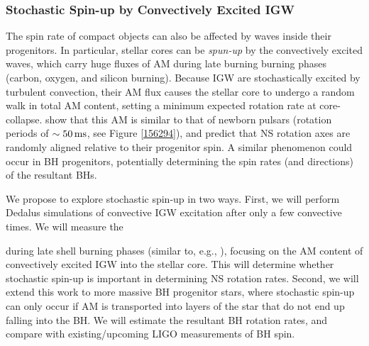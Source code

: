 \subsubsection{Stochastic Spin-up by Convectively Excited IGW}

The spin rate of compact objects can also be affected by waves inside their progenitors. In particular, stellar cores can be {\it spun-up} by the convectively excited waves, which carry huge fluxes of AM during late burning burning phases (carbon, oxygen, and silicon burning). Because IGW are stochastically excited by turbulent convection, their AM flux causes the stellar core to undergo a random walk in total AM content, setting a minimum expected rotation rate at core-collapse. \cite{fullerwave:15} show that this AM is similar to that of newborn pulsars (rotation periods of $\sim 50 \, {\rm ms}$, see Figure \ref{156294}), and predict that NS rotation axes are randomly aligned relative to their progenitor spin. A similar phenomenon could occur in BH progenitors, potentially determining the spin rates (and directions) of the resultant BHs.

We propose to explore stochastic spin-up in two ways. First, we will perform Dedalus simulations of convective IGW excitation after only a few convective times. We will measure the 

during late shell burning phases (similar to, e.g., \cite{meakina:07,couch:15,cristini:16,}), focusing on the AM content of convectively excited IGW into the stellar core. This will determine whether stochastic spin-up is important in determining NS rotation rates. Second, we will extend this work to more massive BH progenitor stars, where stochastic spin-up can only occur if AM is transported into layers of the star that do not end up falling into the BH. We will estimate the resultant BH rotation rates, and compare with existing/upcoming LIGO measurements of BH spin.


